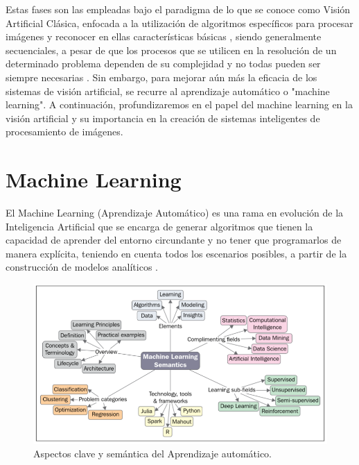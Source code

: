 Estas fases son las empleadas bajo el paradigma de lo que se conoce como Visión
Artificial Clásica, enfocada a la utilización de algoritmos específicos para procesar imágenes y reconocer en ellas características básicas \cite{Martinez22}, siendo generalmente secuenciales, a pesar de que los procesos que se utilicen en la resolución de un determinado problema dependen de su complejidad y no todas pueden ser siempre necesarias \cite{Santillan15}. Sin embargo, para mejorar aún más la eficacia de los sistemas de visión artificial, se recurre al aprendizaje automático o "machine learning". A continuación, profundizaremos en el papel del machine learning en la visión artificial y su importancia en la creación de sistemas inteligentes de procesamiento de imágenes. \\

\pagebreak

\section{Machine Learning}
\label{sec:MachineLearning} 

El Machine Learning (Aprendizaje Automático) es una rama en evolución de la Inteligencia Artificial que se encarga de generar algoritmos que tienen la capacidad de aprender del entorno circundante y no tener que programarlos de manera explícita, teniendo en cuenta todos los escenarios posibles, a partir de la construcción de modelos analíticos \cite{Sandoval18}.

 \begin{figure} [h!]
    \begin{center}
      \includegraphics[width=12cm]{figs/ML semantics.png}
    \end{center}
    \caption{Aspectos clave y semántica del Aprendizaje automático.}
    \label{fig:ML semantics}
\end{figure}

